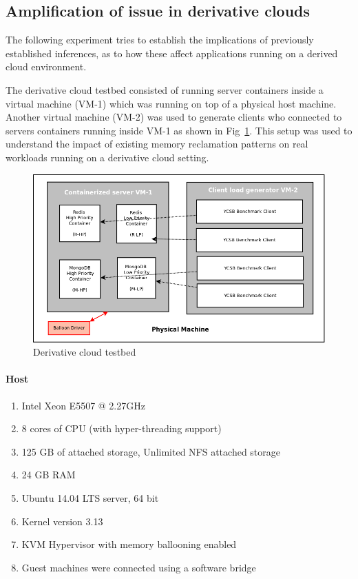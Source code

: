   
    \subsection{Amplification of issue in derivative clouds}
    
      The following experiment tries to establish the implications of previously established inferences, as to how these affect 
applications running on a derived cloud environment.

      The derivative cloud testbed consisted of running server containers inside a virtual machine (VM-1) which was running on top of a 
physical host machine. Another virtual machine (VM-2) was used to generate clients who connected to servers containers running inside VM-1 
as shown in Fig~\ref{img:derived_setup}. This setup was used to understand the impact of existing memory reclamation patterns on real 
workloads running on a derivative cloud setting.
      
      \begin{figure}
	\centering
	\includegraphics[width=1\textwidth]{images/controller_issues/derivative_setup.png}
	\caption{Derivative cloud testbed}
	\label{img:derived_setup}
      \end{figure}
      
      \paragraph{Host}	
	\begin{enumerate}
	  \item Intel Xeon E5507 @ 2.27GHz
	  \item 8 cores of CPU (with hyper-threading support)
	  \item 125 GB of attached storage, Unlimited NFS attached storage 
	  \item 24 GB RAM
	  \item Ubuntu 14.04 LTS server, 64 bit 
	  \item Kernel version 3.13
	  \item KVM Hypervisor with memory ballooning enabled
	  \item Guest machines were connected using a software bridge
	\end{enumerate}
      
